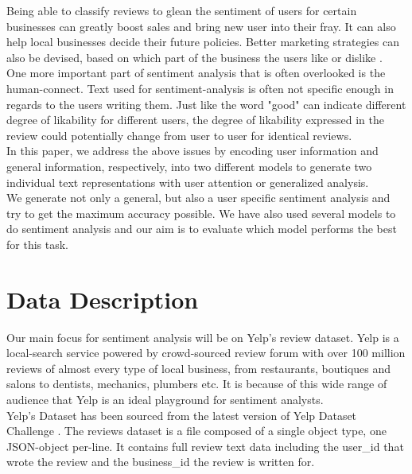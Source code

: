 \documentclass[letterpaper, 10 pt, conference]{ieeeconf}  %
\begin{document}
Being able to classify reviews to glean the sentiment of users for certain businesses can greatly boost sales and bring new user into their fray. It can also help local businesses decide their future policies. Better marketing strategies can also be devised, based on which part of the business the users like or dislike \cite{c2}. \\

One more important part of sentiment analysis that is often overlooked is the human-connect. Text used for sentiment-analysis is often not specific enough in regards to the users writing them. Just like the word "good" can indicate different degree of likability for different users, the degree of likability expressed in the review could potentially change from user to user for identical reviews.\\

In this paper, we address the above issues by encoding user information and general information, respectively, into two different models to generate two individual text representations with user attention or generalized analysis. \\

We generate not only a general, but also a user specific sentiment analysis and try to get the maximum accuracy possible. We have also used several models to do sentiment analysis and our aim is to evaluate which model performs the best for this task. 

\section{Data Description}

Our main focus for sentiment analysis will be on Yelp's review dataset. Yelp is a local-search service powered by crowd-sourced review forum with over 100 million reviews of almost every type of local business, from restaurants, boutiques and salons to dentists, mechanics, plumbers etc. It is because of this wide range of audience that Yelp is an ideal playground for sentiment analysts.\\ 

Yelp's Dataset has been sourced from the latest version of Yelp Dataset Challenge \cite{c3}. The reviews dataset is a file composed of a single object type, one JSON-object per-line. It contains full review text data including the user\_id that wrote the review and the business\_id the review is written for.\\
\end{document}
